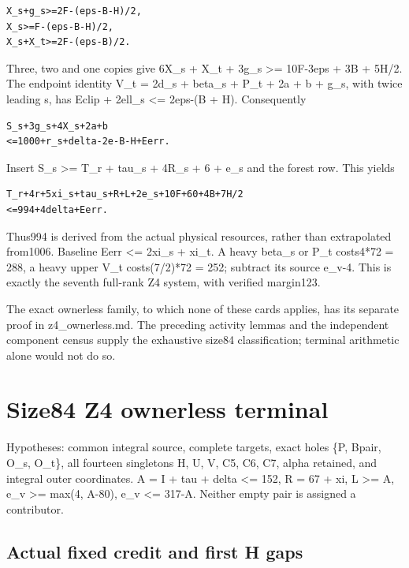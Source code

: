 \documentclass[11pt,a4paper]{article}
\begin{document}
\begin{verbatim}
X_s+g_s>=2F-(eps-B-H)/2,
X_s>=F-(eps-B-H)/2,
X_s+X_t>=2F-(eps-B)/2.
\end{verbatim}

Three, two and one copies give 6X\_s + X\_t + 3g\_s \textgreater=
10F-3eps + 3B + 5H/2. The endpoint identity V\_t = 2d\_s + beta\_s +
P\_t + 2a + b + g\_s, with twice leading s, has Eclip + 2ell\_s
\textless= 2eps-(B + H). Consequently

\begin{verbatim}
S_s+3g_s+4X_s+2a+b
<=1000+r_s+delta-2e-B-H+Eerr.
\end{verbatim}

Insert S\_s \textgreater= T\_r + tau\_s + 4R\_s + 6 + e\_s and the
forest row. This yields

\begin{verbatim}
T_r+4r+5xi_s+tau_s+R+L+2e_s+10F+60+4B+7H/2
<=994+4delta+Eerr.
\end{verbatim}

Thus994 is derived from the actual physical resources, rather than
extrapolated from1006. Baseline Eerr \textless= 2xi\_s + xi\_t. A heavy
beta\_s or P\_t costs4*72 = 288, a heavy upper V\_t costs(7/2)*72 = 252;
subtract its source e\_v-4. This is exactly the seventh full-rank Z4
system, with verified margin123.

The exact ownerless family, to which none of these cards applies, has
its separate proof in z4\_ownerless.md. The preceding activity lemmas
and the independent component census supply the exhaustive size84
classification; terminal arithmetic alone would not do so.

\clearpage
\hypertarget{size84-z4-ownerless-terminal}{%
\section{Size84 Z4 ownerless
terminal}\label{size84-z4-ownerless-terminal}}

Hypotheses: common integral source, complete targets, exact holes \{P,
Bpair, O\_s, O\_t\}, all fourteen singletons H, U, V, C5, C6, C7, alpha
retained, and integral outer coordinates. A = I + tau + delta \textless=
152, R = 67 + xi, L \textgreater= A, e\_v \textgreater= max(4, A-80),
e\_v \textless= 317-A. Neither empty pair is assigned a contributor.

\hypertarget{actual-fixed-credit-and-first-h-gaps}{%
\subsection{Actual fixed credit and first H
gaps}\label{actual-fixed-credit-and-first-h-gaps}}
\end{document}
